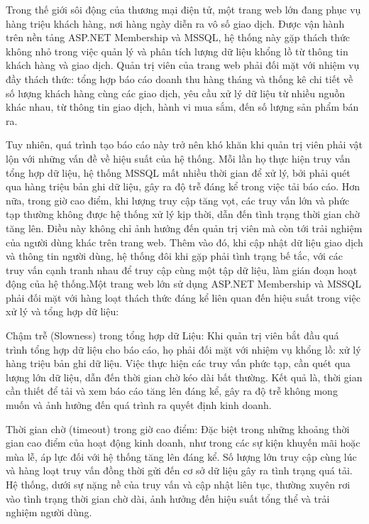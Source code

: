 \documentclass{article}[14pt]
\begin{document}
{Trong thế giới sôi động của thương mại điện tử, một trang web lớn đang phục vụ hàng triệu khách hàng, nơi hàng ngày diễn ra vô số giao dịch. Được vận hành trên nền tảng ASP.NET Membership và MSSQL, hệ thống này gặp thách thức không nhỏ trong việc quản lý và phân tích lượng dữ liệu khổng lồ từ thông tin khách hàng và giao dịch. Quản trị viên của trang web phải đối mặt với nhiệm vụ đầy thách thức: tổng hợp báo cáo doanh thu hàng tháng và thống kê chi tiết về số lượng khách hàng cùng các giao dịch, yêu cầu xử lý dữ liệu từ nhiều nguồn khác nhau, từ thông tin giao dịch, hành vi mua sắm, đến số lượng sản phẩm bán ra.

Tuy nhiên, quá trình tạo báo cáo này trở nên khó khăn khi quản trị viên phải vật lộn với những vấn đề về hiệu suất của hệ thống. Mỗi lần họ thực hiện truy vấn tổng hợp dữ liệu, hệ thống MSSQL mất nhiều thời gian để xử lý, bởi phải quét qua hàng triệu bản ghi dữ liệu, gây ra độ trễ đáng kể trong việc tải báo cáo. Hơn nữa, trong giờ cao điểm, khi lượng truy cập tăng vọt, các truy vấn lớn và phức tạp thường không được hệ thống xử lý kịp thời, dẫn đến tình trạng thời gian chờ tăng lên. Điều này không chỉ ảnh hưởng đến quản trị viên mà còn tới trải nghiệm của người dùng khác trên trang web. Thêm vào đó, khi cập nhật dữ liệu giao dịch và thông tin người dùng, hệ thống đôi khi gặp phải tình trạng bế tắc, với các truy vấn cạnh tranh nhau để truy cập cùng một tập dữ liệu, làm gián đoạn hoạt động của hệ thống.Một trang web lớn sử dụng ASP.NET Membership và MSSQL phải đối mặt với hàng loạt thách thức đáng kể liên quan đến hiệu suất trong việc xử lý và tổng hợp dữ liệu:

Chậm trễ (Slowness) trong tổng hợp dữ Liệu:
Khi quản trị viên bắt đầu quá trình tổng hợp dữ liệu cho báo cáo, họ phải đối mặt với nhiệm vụ khổng lồ: xử lý hàng triệu bản ghi dữ liệu. Việc thực hiện các truy vấn phức tạp, cần quét qua lượng lớn dữ liệu, dẫn đến thời gian chờ kéo dài bất thường. Kết quả là, thời gian cần thiết để tải và xem báo cáo tăng lên đáng kể, gây ra độ trễ không mong muốn và ảnh hưởng đến quá trình ra quyết định kinh doanh.

Thời gian chờ (timeout) trong giờ cao điểm:
Đặc biệt trong những khoảng thời gian cao điểm của hoạt động kinh doanh, như trong các sự kiện khuyến mãi hoặc mùa lễ, áp lực đối với hệ thống tăng lên đáng kể. Số lượng lớn truy cập cùng lúc và hàng loạt truy vấn đồng thời gửi đến cơ sở dữ liệu gây ra tình trạng quá tải. Hệ thống, dưới sự nặng nề của truy vấn và cập nhật liên tục, thường xuyên rơi vào tình trạng thời gian chờ dài, ảnh hưởng đến hiệu suất tổng thể và trải nghiệm người dùng.

}
\end{document}
